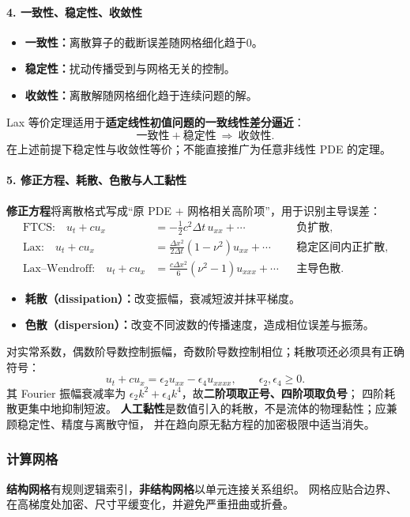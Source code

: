 \paragraph{4. 一致性、稳定性、收敛性}
\begin{itemize}
 \item \textbf{一致性：}离散算子的截断误差随网格细化趋于0。
 \item \textbf{稳定性：}扰动传播受到与网格无关的控制。
 \item \textbf{收敛性：}离散解随网格细化趋于连续问题的解。
\end{itemize}
Lax 等价定理适用于\textbf{适定线性初值问题的一致线性差分逼近}：
\[
 \boxed{\text{一致性}+\text{稳定性}\ \Longrightarrow\ \text{收敛性}}.
\]
在上述前提下稳定性与收敛性等价；不能直接推广为任意非线性 PDE 的定理。

\paragraph{5. 修正方程、耗散、色散与人工黏性}
\textbf{修正方程}将离散格式写成“原 PDE $+$ 网格相关高阶项”，用于识别主导误差：
\begin{align*}
 \text{FTCS:}\quad u_t+cu_x
   &=-\tfrac12c^2\Delta t\,u_{xx}+\cdots
      &&\text{负扩散},\\
 \text{Lax:}\quad u_t+cu_x
   &=\frac{\Delta x^2}{2\Delta t}(1-\nu^2)u_{xx}+\cdots
      &&\text{稳定区间内正扩散},\\
 \text{Lax--Wendroff:}\quad u_t+cu_x
   &=\frac{c\Delta x^2}{6}(\nu^2-1)u_{xxx}+\cdots
      &&\text{主导色散}.
\end{align*}
\begin{itemize}
 \item \textbf{耗散（dissipation）：}改变振幅，衰减短波并抹平梯度。
 \item \textbf{色散（dispersion）：}改变不同波数的传播速度，造成相位误差与振荡。
\end{itemize}
对实常系数，偶数阶导数控制振幅，奇数阶导数控制相位；耗散项还必须具有正确符号：
\[
 u_t+cu_x=\epsilon_2u_{xx}-\epsilon_4u_{xxxx},\qquad
 \epsilon_2,\epsilon_4\ge0.
\]
其 Fourier 振幅衰减率为 $\epsilon_2k^2+\epsilon_4k^4$，故\textbf{二阶项取正号、四阶项取负号}；
四阶耗散更集中地抑制短波。
\textbf{人工黏性}是数值引入的耗散，不是流体的物理黏性；应兼顾稳定性、精度与离散守恒，
并在趋向原无黏方程的加密极限中适当消失。

\subsubsection{计算网格}
\label{sec:cfd-grid}
\textbf{结构网格}有规则逻辑索引，\textbf{非结构网格}以单元连接关系组织。
网格应贴合边界、在高梯度处加密、尺寸平缓变化，并避免严重扭曲或折叠。

